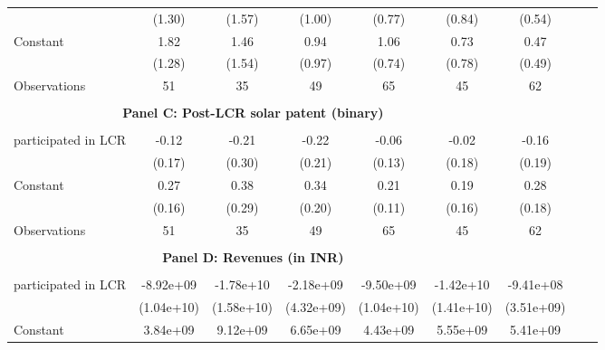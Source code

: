 \begin{table}[htbp]
\begin{tabular}{l*{8}{c}}
                    &      (1.30)         &      (1.57)         &      (1.00)         &      (0.77)         &      (0.84)         &      (0.54)         \\
[1em]
Constant            &        1.82         &        1.46         &        0.94         &        1.06         &        0.73         &        0.47         \\
                    &      (1.28)         &      (1.54)         &      (0.97)         &      (0.74)         &      (0.78)         &      (0.49)         \\
\hline
Observations        &          51         &          35         &          49         &          65         &          45         &          62         \\
\hline \\ \multicolumn{6}{c}{\textbf{Panel C: Post-LCR solar patent (binary)}} \\\\[-1ex]
participated in LCR &       -0.12         &       -0.21         &       -0.22         &       -0.06         &       -0.02         &       -0.16         \\
                    &      (0.17)         &      (0.30)         &      (0.21)         &      (0.13)         &      (0.18)         &      (0.19)         \\
[1em]
Constant            &        0.27\sym{*}  &        0.38         &        0.34\sym{*}  &        0.21\sym{*}  &        0.19         &        0.28         \\
                    &      (0.16)         &      (0.29)         &      (0.20)         &      (0.11)         &      (0.16)         &      (0.18)         \\
\hline
Observations        &          51         &          35         &          49         &          65         &          45         &          62         \\
\hline \\ \multicolumn{6}{c}{\textbf{Panel D: Revenues (in INR)}} \\\\[-1ex]
participated in LCR &   -8.92e+09         &   -1.78e+10         &   -2.18e+09         &   -9.50e+09         &   -1.42e+10         &   -9.41e+08         \\
                    &  (1.04e+10)         &  (1.58e+10)         &  (4.32e+09)         &  (1.04e+10)         &  (1.41e+10)         &  (3.51e+09)         \\
[1em]
Constant            &    3.84e+09         &    9.12e+09         &    6.65e+09         &    4.43e+09         &    5.55e+09         &    5.41e+09\sym{*}  \\

\end{tabular}
\end{table}
